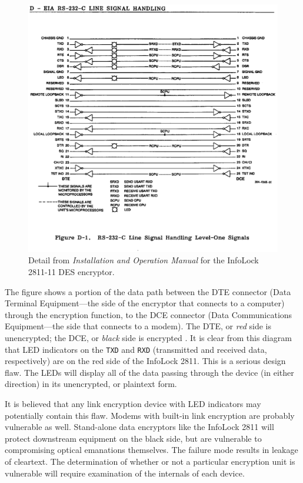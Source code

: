 \documentclass{acmtrans2e}
\begin{document}
\begin{figure}
\centering
\includegraphics[width=\textwidth]{Figure_5.eps}
\caption{Detail from {\it Installation and Operation Manual} 
for the InfoLock 2811-11 DES encryptor.}
\label{infolock_2811_figure}
\end{figure}

The figure shows a portion of the data path between the DTE connector 
(Data Terminal Equipment---the side of the encryptor that connects to a 
computer) through the encryption function, to the DCE connector (Data 
Communications Equipment---the side that connects to a modem).  The DTE, 
or {\it red} side is unencrypted; the DCE, or {\it black} side is 
encrypted \cite{mil_hdbk_232_a}.  It is clear from this diagram that LED 
indicators on the {\tt TXD} and {\tt RXD} (transmitted and received 
data, respectively) are on the red side of the InfoLock 2811.
This is a serious design 
flaw.  The LEDs will display all of the data passing through the device 
(in either direction) in its unencrypted, or plaintext form.

It is believed that any link encryption device with LED indicators may 
potentially contain this flaw.  Modems with built-in link encryption are 
probably vulnerable as well.  Stand-alone data encryptors like the InfoLock 2811 
will protect downstream equipment on the black side, but are vulnerable
to compromising optical emanations themselves.  The failure mode results
in leakage of cleartext.  The determination of whether or not a 
particular encryption unit is vulnerable will require examination of the 
internals of each device.
\end{document}
